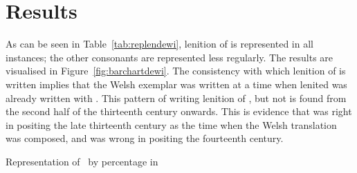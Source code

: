 \begin{mwl}
\end{mwl}


\section{Results}
\label{sec:results-1}
As can be seen in Table~\ref{tab:replendewi}, lenition of  is represented in all instances; the other consonants are represented less regularly. The results are visualised in Figure~\ref{fig:barchartdewi}. The consistency with which lenition of  is written implies that the Welsh exemplar was written at a time when lenited  was already written with . This pattern of writing lenition of , but not  is found from the second half of the thirteenth century onwards. This is evidence that \textcite{Rob_Ystoriaeu11} was right in positing the late thirteenth century as the time when the Welsh translation was composed, and \textcite{Eva_Welsh88} was wrong in positing the fourteenth century.


\begin{table}[h]
  \centering
  
  \caption{Representation of \lT\ by percentage in }
  \label{tab:replendewi}
\end{table} 

%   

